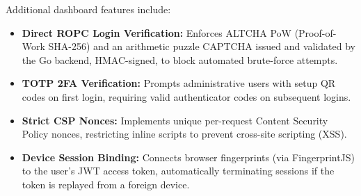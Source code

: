 \begin{table}[h]
\centering
{}
\caption{WebUI Page Features}
\label{tab:webui-features-final}
\end{table}

Additional dashboard features include:
\begin{itemize}
    \item \textbf{Direct ROPC Login Verification:} Enforces ALTCHA PoW (Proof-of-Work SHA-256) and an arithmetic puzzle CAPTCHA issued and validated by the Go backend, HMAC-signed, to block automated brute-force attempts.
    \item \textbf{TOTP 2FA Verification:} Prompts administrative users with setup QR codes on first login, requiring valid authenticator codes on subsequent logins.
    \item \textbf{Strict CSP Nonces:} Implements unique per-request Content Security Policy nonces, restricting inline scripts to prevent cross-site scripting (XSS).
    \item \textbf{Device Session Binding:} Connects browser fingerprints (via FingerprintJS) to the user's JWT access token, automatically terminating sessions if the token is replayed from a foreign device.
\end{itemize}


